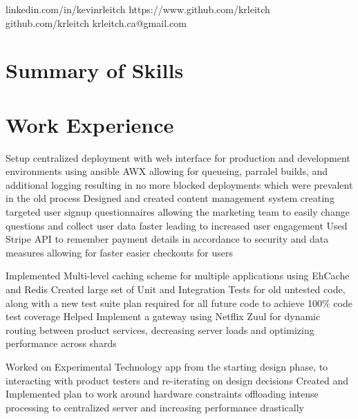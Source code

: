 \documentclass{my_resume}
\begin{document}
        {linkedin.com/in/kevinrleitch}
        {https://www.github.com/krleitch}
        {github.com/krleitch}
        {krleitch.ca@gmail.com}

\section{Summary of Skills}

\section{Work Experience}

\workitemsthree
{Setup centralized deployment with web interface for production and development environments using ansible AWX allowing for queueing, parralel builds,
and additional logging resulting in no more blocked deployments which were prevalent in the old process}
{Designed and created content management system creating targeted user signup questionnaires allowing the marketing team to easily change questions and
collect user data faster leading to increased user engagement}
{Used Stripe API to remember payment details in accordance to security and data measures allowing for faster easier checkouts for users}

\workitemsthree
{Implemented Multi-level caching scheme for multiple applications using EhCache and Redis}
{Created large set of Unit and Integration Tests for old untested code, along with a new test suite plan required for all future code to achieve 100\% code test coverage}
{Helped Implement a gateway using Netflix Zuul for dynamic routing between product services, decreasing server loads and optimizing performance across shards}

\workitemstwo
{Worked on Experimental Technology app from the starting design phase, to interacting with product testers and re-iterating on design decisions}
{Created and Implemented plan to work around hardware constraints offloading intense processing to centralized server and increasing performance drastically}
\end{document}
